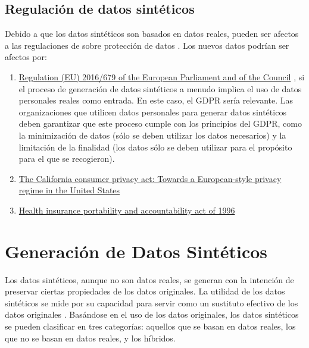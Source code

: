 \subsection{Regulación de datos sintéticos}
Debido a que los datos sintéticos son basados en datos reales, pueden ser afectos a las regulaciones de sobre protección de datos \cite{bruce_practical_2020}. Los nuevos datos podrían ser afectos por:
\begin{enumerate}
    \item \href{https://dvbi.ru/Portals/0/DOCUMENTS_SHARE/RISK_MANAGEMENT/EBA/GDPR_eng_rus.pdf}{Regulation (EU) 2016/679 of the European Parliament and of the Council} \cite{regulation_regulation_2016}, si el proceso de generación de datos sintéticos a menudo implica el uso de datos personales reales como entrada. En este caso, el GDPR sería relevante. Las organizaciones que utilicen datos personales para generar datos sintéticos deben garantizar que este proceso cumple con los principios del GDPR, como la minimización de datos (sólo se deben utilizar los datos necesarios) y la limitación de la finalidad (los datos sólo se deben utilizar para el propósito para el que se recogieron).
    \item \href{https://heinonline.org/HOL/LandingPage?handle=hein.journals/jtlp23&div=5&id=&page=}{The California consumer privacy act: Towards a European-style privacy regime in the United States} \cite{pardau_california_2018}
    \item \href{http://www.eolusinc.com/pdf/hipaa.pdf}{Health insurance portability and accountability act of 1996} \cite{act_health_1996}
\end{enumerate}

\section{Generación de Datos Sintéticos}

Los datos sintéticos, aunque no son datos reales, se generan con la intención de preservar ciertas propiedades de los datos originales. La utilidad de los datos sintéticos se mide por su capacidad para servir como un sustituto efectivo de los datos originales \cite{bruce_practical_2020}. Basándose en el uso de los datos originales, los datos sintéticos se pueden clasificar en tres categorías: aquellos que se basan en datos reales, los que no se basan en datos reales, y los híbridos.

